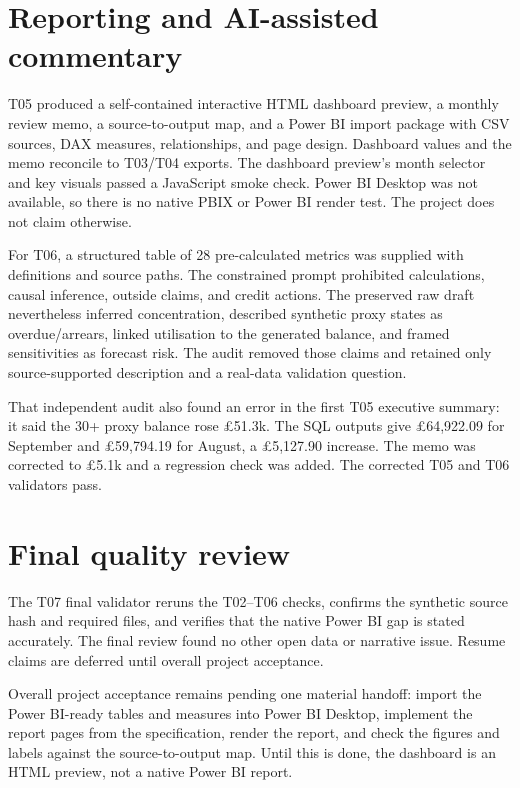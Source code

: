 \documentclass[11pt]{article}
\begin{document}
\section{Reporting and AI-assisted commentary}

T05 produced a self-contained interactive HTML dashboard preview, a monthly review memo, a source-to-output map, and a Power BI import package with CSV sources, DAX measures, relationships, and page design. Dashboard values and the memo reconcile to T03/T04 exports. The dashboard preview's month selector and key visuals passed a JavaScript smoke check. Power BI Desktop was not available, so there is no native PBIX or Power BI render test. The project does not claim otherwise.

For T06, a structured table of 28 pre-calculated metrics was supplied with definitions and source paths. The constrained prompt prohibited calculations, causal inference, outside claims, and credit actions. The preserved raw draft nevertheless inferred concentration, described synthetic proxy states as overdue/arrears, linked utilisation to the generated balance, and framed sensitivities as forecast risk. The audit removed those claims and retained only source-supported description and a real-data validation question.

That independent audit also found an error in the first T05 executive summary: it said the 30+ proxy balance rose £51.3k. The SQL outputs give £64,922.09 for September and £59,794.19 for August, a £5,127.90 increase. The memo was corrected to £5.1k and a regression check was added. The corrected T05 and T06 validators pass.

\section{Final quality review}

The T07 final validator reruns the T02–T06 checks, confirms the synthetic source hash and required files, and verifies that the native Power BI gap is stated accurately. The final review found no other open data or narrative issue. Resume claims are deferred until overall project acceptance.

Overall project acceptance remains pending one material handoff: import the Power BI-ready tables and measures into Power BI Desktop, implement the report pages from the specification, render the report, and check the figures and labels against the source-to-output map. Until this is done, the dashboard is an HTML preview, not a native Power BI report.
\end{document}
